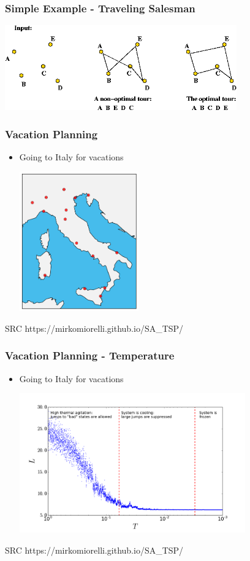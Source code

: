 \documentclass[10pt]{beamer}
\begin{document}
\begin{frame}
  \frametitle{Simple Example - Traveling Salesman}
  \centerline{\includegraphics[width=10cm]{tsp}}
\end{frame}

\begin{frame}
  \frametitle{Vacation Planning}
  \begin{itemize}
    \item Going to Italy for vacations
          \centerline{\includegraphics[height=6cm]{Italy_simann}}
  \end{itemize}
  \centerline{SRC https://mirkomiorelli.github.io/SA\_TSP/}
\end{frame}

\begin{frame}
  \frametitle{Vacation Planning - Temperature}
  \begin{itemize}
    \item Going to Italy for vacations
          \centerline{\includegraphics[height=6cm]{annealing_temperature}}
  \end{itemize}
  \centerline{SRC https://mirkomiorelli.github.io/SA\_TSP/}
\end{frame}
\end{document}
